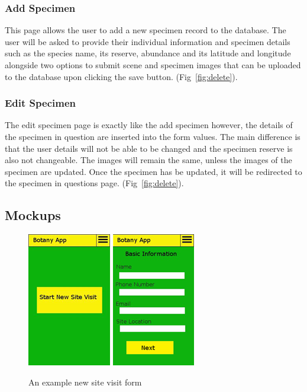  \subsubsection{ Add Specimen}
     This page allows the user to add a new specimen record to the database. The user will be asked to provide their individual information and specimen details such as the species name, its reserve, abundance and its latitude and longitude alongside two options to submit scene and specimen images that can be uploaded to the database upon clicking the save button.  (Fig~\ref{fig:delete}).

 \subsubsection{Edit Specimen}
        The edit specimen page is exactly like the add specimen however, the details of the specimen in question are inserted into the form values. The main difference is that the user details will not be able to be changed and the specimen reserve is also not changeable. The images will remain the same, unless the images of the specimen are updated. Once the specimen has be updated, it will be redirected to the specimen in questions page.  (Fig~\ref{fig:delete}).

    \subsection{Mockups}

        \begin{figure}
            \centering
            \includegraphics[scale=1]{uiDesign/botanyAppNewSiteVisit1.png}
            \includegraphics[scale=1]{uiDesign/botanyAppNewSiteVisit2.png}
            \caption{An example new site visit form}
            \label{fig:newSiteVisit}
        \end{figure}

